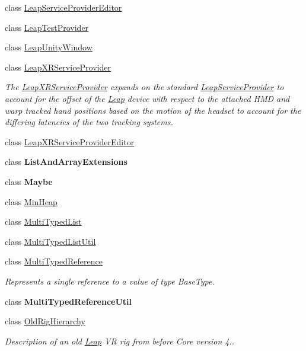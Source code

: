 \begin{DoxyCompactItemize}
class \mbox{\hyperlink{class_leap_1_1_unity_1_1_leap_service_provider_editor}{Leap\+Service\+Provider\+Editor}}
\item 
class \mbox{\hyperlink{class_leap_1_1_unity_1_1_leap_test_provider}{Leap\+Test\+Provider}}
\item 
class \mbox{\hyperlink{class_leap_1_1_unity_1_1_leap_unity_window}{Leap\+Unity\+Window}}
\item 
class \mbox{\hyperlink{class_leap_1_1_unity_1_1_leap_x_r_service_provider}{Leap\+X\+R\+Service\+Provider}}
\begin{DoxyCompactList}\small\item\em The \mbox{\hyperlink{class_leap_1_1_unity_1_1_leap_x_r_service_provider}{Leap\+X\+R\+Service\+Provider}} expands on the standard \mbox{\hyperlink{class_leap_1_1_unity_1_1_leap_service_provider}{Leap\+Service\+Provider}} to account for the offset of the \mbox{\hyperlink{namespace_leap_1_1_unity_1_1_leap}{Leap}} device with respect to the attached H\+MD and warp tracked hand positions based on the motion of the headset to account for the differing latencies of the two tracking systems. \end{DoxyCompactList}\item 
class \mbox{\hyperlink{class_leap_1_1_unity_1_1_leap_x_r_service_provider_editor}{Leap\+X\+R\+Service\+Provider\+Editor}}
\item 
class {\bfseries List\+And\+Array\+Extensions}
\item 
class {\bfseries Maybe}
\item 
class \mbox{\hyperlink{class_leap_1_1_unity_1_1_min_heap}{Min\+Heap}}
\item 
class \mbox{\hyperlink{class_leap_1_1_unity_1_1_multi_typed_list}{Multi\+Typed\+List}}
\item 
class \mbox{\hyperlink{class_leap_1_1_unity_1_1_multi_typed_list_util}{Multi\+Typed\+List\+Util}}
\item 
class \mbox{\hyperlink{class_leap_1_1_unity_1_1_multi_typed_reference}{Multi\+Typed\+Reference}}
\begin{DoxyCompactList}\small\item\em Represents a single reference to a value of type Base\+Type. \end{DoxyCompactList}\item 
class {\bfseries Multi\+Typed\+Reference\+Util}
\item 
class \mbox{\hyperlink{class_leap_1_1_unity_1_1_old_rig_hierarchy}{Old\+Rig\+Hierarchy}}
\begin{DoxyCompactList}\small\item\em Description of an old \mbox{\hyperlink{namespace_leap_1_1_unity_1_1_leap}{Leap}} VR rig from before Core version 4.. \end{DoxyCompactList}\item 

\end{DoxyCompactItemize}
